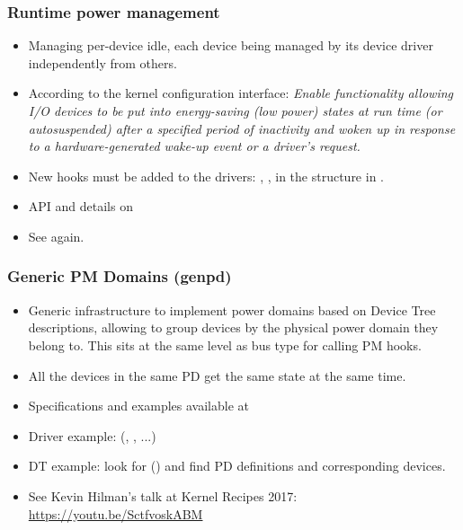 \begin{frame}
  \frametitle{Runtime power management}
  \begin{itemize}
  \item Managing per-device idle, each device being managed by its
        device driver independently from others.
  \item According to the kernel configuration interface: \emph{Enable
      functionality allowing I/O devices to be put into energy-saving
      (low power) states at run time (or autosuspended) after a
      specified period of inactivity and woken up in response to a
      hardware-generated wake-up event or a driver's request.}
  \item New hooks must be added to the drivers:
    , ,
     in the 
    structure in .
  \item API and details on 
  \item See  again.
  \end{itemize}
\end{frame}

\begin{frame}
  \frametitle{Generic PM Domains (genpd)}
  \begin{itemize}
  \item Generic infrastructure to implement power domains based on
        Device Tree descriptions, allowing to group devices by the
        physical power domain they belong to.
        This sits at the same level as bus type for calling PM hooks.
  \item All the devices in the same PD get the same state at the same time.
  \item Specifications and examples available at 
  \item Driver example: 
        (, ,
        ...)
  \item DT example: look for 
        () and find PD definitions
        and corresponding devices.
  \item See Kevin Hilman's talk at Kernel Recipes 2017: \url{https://youtu.be/SctfvoskABM}
  \end{itemize}
\end{frame}

